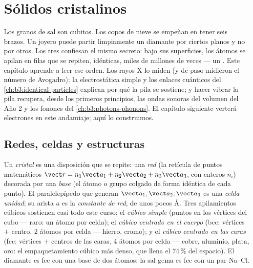 \chapter{Sólidos cristalinos}\label{ch:b3:crystalline-solids}


Los granos de sal son cubitos. Los copos de nieve se empeñan en tener seis brazos. Un
joyero puede partir limpiamente un diamante por ciertos planos y no
por otros. Los tres confiesan el mismo secreto: bajo sus superficies,
los átomos se apilan en filas que se repiten, idénticas, miles de millones de
veces --- un \emph{}. Este capítulo aprende a leer ese
orden. Los rayos X lo miden (y de paso midieron el número de Avogadro);
la electrostática simple y los enlaces cuánticos del
\cref{ch:b3:identical-particles} explican por qué la pila se
sostiene; y hacer vibrar la pila recupera, desde los primeros
principios, las ondas sonoras del volumen del Año 2 y los fonones del
\cref{ch:b3:photons-phonons}. El capítulo siguiente verterá electrones
en este andamiaje; aquí lo construimos.

\section{Redes, celdas y estructuras}

\begin{definition}\label{def:b3:crystalline-solids:lattice}
Un \emph{cristal} es una disposición que se repite: una \emph{red} (la
retícula de puntos matemáticos $\vect r = n_1\vect a_1 + n_2\vect a_2
+ n_3\vect a_3$, con enteros $n_i$) decorada por una \emph{base} (el
átomo o grupo colgado de forma idéntica de cada punto). El paralelepípedo
que generan $\vect a_1, \vect a_2, \vect a_3$ es una \emph{celda unidad};
su arista $a$ es la \emph{constante de red}, de unos pocos
\unit{\angstrom}. Tres apilamientos cúbicos sostienen casi todo este curso:
el \emph{cúbico simple} (puntos en los vértices del cubo --- raro: un átomo por
celda); el \emph{cúbico centrado en el cuerpo} (bcc: vértices $+$ centro, 2 átomos
por celda --- hierro, cromo); y el \emph{cúbico centrado en las caras} (fcc:
vértices $+$ centros de las caras, 4 átomos por celda --- cobre, aluminio,
plata, oro: el empaquetamiento cúbico más denso, que llena el 74\,\% del espacio).
El diamante es fcc con una base de dos átomos; la sal gema es fcc con un
par Na--Cl.
\end{definition}

